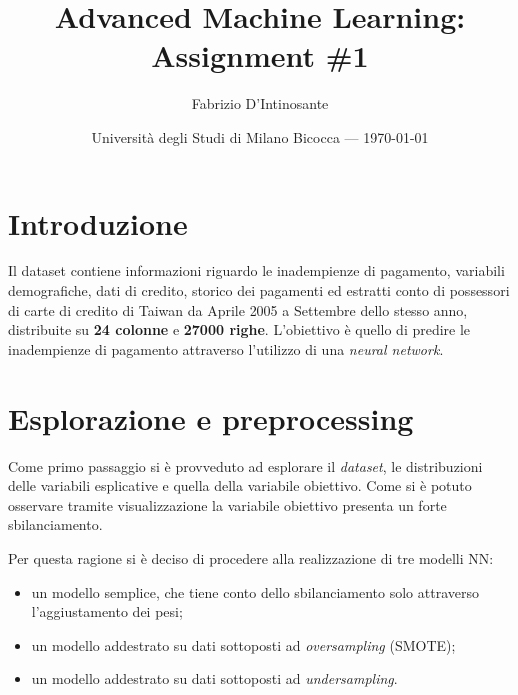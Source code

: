\documentclass{article}
\title{Advanced Machine Learning: Assignment \#1} %
\author{Fabrizio D'Intinosante} %
\date{Università degli Studi di Milano Bicocca --- \today} %
\begin{document}
\maketitle %


\section*{Introduzione} %

 
 
Il dataset contiene informazioni riguardo le inadempienze di pagamento, variabili demografiche, dati di credito, storico dei pagamenti ed estratti conto di possessori di carte di credito di Taiwan da Aprile 2005 a Settembre dello stesso anno, distribuite su \textbf{24 colonne} e \textbf{27000 righe}. 
L'obiettivo è quello di predire le inadempienze di pagamento attraverso l'utilizzo di una \textit{neural network}.

\section{Esplorazione e preprocessing} %

Come primo passaggio si è provveduto ad esplorare il \textit{dataset}, le distribuzioni delle variabili esplicative e quella della variabile obiettivo. Come si è potuto osservare tramite visualizzazione la variabile obiettivo presenta un forte sbilanciamento.


Per questa ragione si è deciso di procedere alla realizzazione di tre modelli NN:
\begin{itemize}[noitemsep]
\item un modello semplice, che tiene conto dello sbilanciamento solo attraverso l'aggiustamento dei pesi;
\item un modello addestrato su dati sottoposti ad \textit{oversampling} (SMOTE);
\item un modello addestrato su dati sottoposti ad \textit{undersampling}.
\end{itemize}
\end{document}

